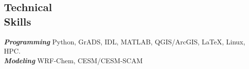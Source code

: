 \documentclass[margin,line]{resume}
\begin{document}
\begin{resume}
		
		
		\vspace{-0.4cm}
		\section{\mysidestyle \textbf{\textcolor{sep}{Technical \\Skills}}}
		
		\textbf{\emph{\textcolor{sep}{Programming}}} \hspace{1mm} Python, GrADS, IDL, MATLAB, QGIS/ArcGIS,  \LaTeX, Linux, HPC.\\
		\textbf{\emph{\textcolor{sep}{Modeling}}} \hspace{8mm} WRF-Chem, CESM/CESM-SCAM  
		
		

\end{resume}
\end{document}
